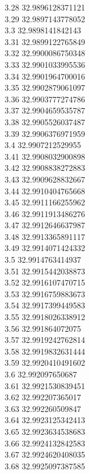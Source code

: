 {3.28	32.9896128371121\\
3.29	32.9897143778052\\
3.3	32.9898141842143\\
3.31	32.9899122765849\\
3.32	32.9900086750348\\
3.33	32.9901033995536\\
3.34	32.9901964700016\\
3.35	32.9902879061097\\
3.36	32.9903777274786\\
3.37	32.9904659535787\\
3.38	32.9905526037487\\
3.39	32.9906376971959\\
3.4	32.9907212529955\\
3.41	32.9908032900898\\
3.42	32.9908838272883\\
3.43	32.9909628832667\\
3.44	32.9910404765668\\
3.45	32.9911166255962\\
3.46	32.9911913486276\\
3.47	32.9912646637987\\
3.48	32.9913365891117\\
3.49	32.9914071424332\\
3.5	32.9914763414937\\
3.51	32.9915442038873\\
3.52	32.9916107470715\\
3.53	32.9916759883673\\
3.54	32.9917399449583\\
3.55	32.9918026338912\\
3.56	32.991864072075\\
3.57	32.9919242762814\\
3.58	32.9919832631444\\
3.59	32.9920410491602\\
3.6	32.992097650687\\
3.61	32.9921530839451\\
3.62	32.992207365017\\
3.63	32.992260509847\\
3.64	32.9923125342413\\
3.65	32.9923634538683\\
3.66	32.9924132842583\\
3.67	32.9924620408035\\
3.68	32.9925097387585\\
}

